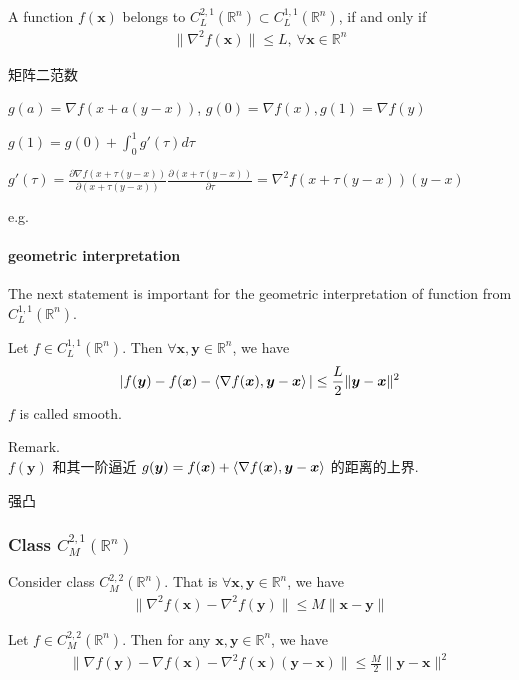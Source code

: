 \begin{lemma}
    A function $f(\bm x)$ belongs to $C_L^{2,1}(\mathbb{R}^n)\subset C_L^{1,1}(\mathbb{R}^n)$, if and only if 
    \begin{align*}
        \|\nabla^2f(\bm x) \|\le L,\ \forall \bm x\in \mathbb{R}^n %
    \end{align*}
\end{lemma}
矩阵二范数

$g(a)=\nabla f(x+a(y-x))$, $g(0)=\nabla f(x), g(1)=\nabla f(y)$

$g(1)=g(0)+\int_0^1 g'(\tau )d\tau$

$g'(\tau)=\frac{\partial \nabla f(x+\tau(y-x))}{\partial (x+\tau(y-x))}\frac{\partial (x+\tau(y-x))}{\partial \tau}=\nabla^2 f(x+\tau(y-x))(y-x)$

e.g. %

\paragraph{geometric interpretation}
The next statement is important for the geometric interpretation of function from $C_L^{1,1}(\mathbb{R}^n)$. 

\begin{lemma}
    Let $f\in C_L^{1,1}(\mathbb{R}^n)$. Then $\forall \bm x, \bm y\in \mathbb{R}^n$, we have
    \begin{align*}
        |f(\bm y)-f(\bm x)-\braket{\nabla f(\bm x), \bm y-\bm x}|\le \frac{L}{2}\|\bm y-\bm x\|^2 %
    \end{align*}
    $f$ is called smooth. 
\end{lemma}
Remark. \\
$f(\bm y)$ 和其一阶逼近 $g(\bm y)=f(\bm x)+\braket{\nabla f(\bm x), \bm y-\bm x}$ 的距离的上界. 


强凸

\subsubsection{Class \texorpdfstring{$C_{M}^{2,1}(\mathbb{R}^n)$}. }
Consider class $C_M^{2,2}(\mathbb{R}^n)$. That is $\forall \bm x,\bm y\in \mathbb{R}^n$, we have
\begin{align*}
    \|\nabla^2f(\bm x)-\nabla^2 f(\bm y)\|\le M\|\bm x-\bm y\|
\end{align*}

\begin{lemma}
    Let $f\in C_M^{2,2}(\mathbb{R}^n)$. Then for any $\bm x,\bm y\in \mathbb{R}^n$, we have 
    \begin{align*}
        \|\nabla f(\bm y)-\nabla f(\bm x)-\nabla^2f(\bm x)(\bm y-\bm x)\| \le \frac{M}{2}\|\bm y-\bm x\|^2 %
    \end{align*}
\end{lemma}

